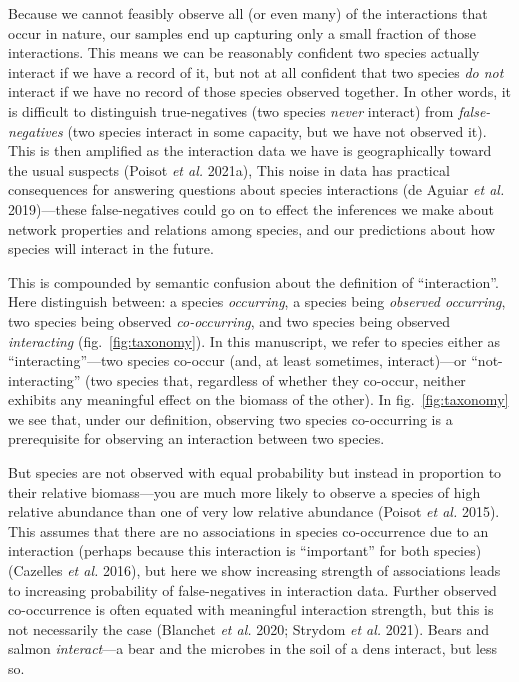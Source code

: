 \documentclass[10pt,oneside]{article}
\begin{document}
Because we cannot feasibly observe all (or even many) of the
interactions that occur in nature, our samples end up capturing only a
small fraction of those interactions. This means we can be reasonably
confident two species actually interact if we have a record of it, but
not at all confident that two species \emph{do not} interact if we have
no record of those species observed together. In other words, it is
difficult to distinguish true-negatives (two species \emph{never}
interact) from \emph{false-negatives} (two species interact in some
capacity, but we have not observed it). This is then amplified as the
interaction data we have is geographically toward the usual suspects
(Poisot \emph{et al.} 2021a), This noise in data has practical
consequences for answering questions about species interactions (de
Aguiar \emph{et al.} 2019)---these false-negatives could go on to effect
the inferences we make about network properties and relations among
species, and our predictions about how species will interact in the
future.

This is compounded by semantic confusion about the definition of
``interaction''. Here distinguish between: a species \emph{occurring}, a
species being \emph{observed occurring}, two species being observed
\emph{co-occurring}, and two species being observed \emph{interacting}
(fig.~\ref{fig:taxonomy}). In this manuscript, we refer to species
either as ``interacting''---two species co-occur (and, at least
sometimes, interact)---or ``not-interacting'' (two species that,
regardless of whether they co-occur, neither exhibits any meaningful
effect on the biomass of the other). In fig.~\ref{fig:taxonomy} we see
that, under our definition, observing two species co-occurring is a
prerequisite for observing an interaction between two species.

But species are not observed with equal probability but instead in
proportion to their relative biomass---you are much more likely to
observe a species of high relative abundance than one of very low
relative abundance (Poisot \emph{et al.} 2015). This assumes that there
are no associations in species co-occurrence due to an interaction
(perhaps because this interaction is ``important'' for both species)
(Cazelles \emph{et al.} 2016), but here we show increasing strength of
associations leads to increasing probability of false-negatives in
interaction data. Further observed co-occurrence is often equated with
meaningful interaction strength, but this is not necessarily the case
(Blanchet \emph{et al.} 2020; Strydom \emph{et al.} 2021). Bears and
salmon \emph{interact}---a bear and the microbes in the soil of a dens
interact, but less so.
\end{document}
